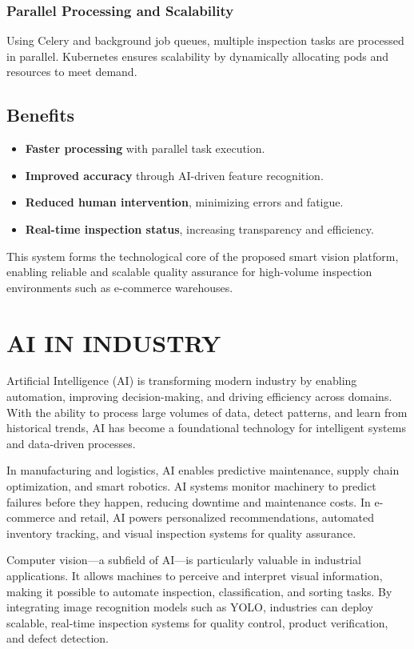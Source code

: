 \documentclass[12pt]{report}
\begin{document}
\subsubsection{Parallel Processing and Scalability}
Using Celery and background job queues, multiple inspection tasks are processed in parallel. Kubernetes ensures scalability by dynamically allocating pods and resources to meet demand.

\subsection{Benefits}
\begin{itemize}
    \item \textbf{Faster processing} with parallel task execution.
    \item \textbf{Improved accuracy} through AI-driven feature recognition.
    \item \textbf{Reduced human intervention}, minimizing errors and fatigue.
    \item \textbf{Real-time inspection status}, increasing transparency and efficiency.
\end{itemize}

\noindent
This system forms the technological core of the proposed smart vision platform, enabling reliable and scalable quality assurance for high-volume inspection environments such as e-commerce warehouses.
\newpage
\section{AI IN INDUSTRY}

Artificial Intelligence (AI) is transforming modern industry by enabling automation, improving decision-making, and driving efficiency across domains. With the ability to process large volumes of data, detect patterns, and learn from historical trends, AI has become a foundational technology for intelligent systems and data-driven processes.

In manufacturing and logistics, AI enables predictive maintenance, supply chain optimization, and smart robotics. AI systems monitor machinery to predict failures before they happen, reducing downtime and maintenance costs. In e-commerce and retail, AI powers personalized recommendations, automated inventory tracking, and visual inspection systems for quality assurance.

Computer vision---a subfield of AI---is particularly valuable in industrial applications. It allows machines to perceive and interpret visual information, making it possible to automate inspection, classification, and sorting tasks. By integrating image recognition models such as YOLO, industries can deploy scalable, real-time inspection systems for quality control, product verification, and defect detection.
\end{document}
